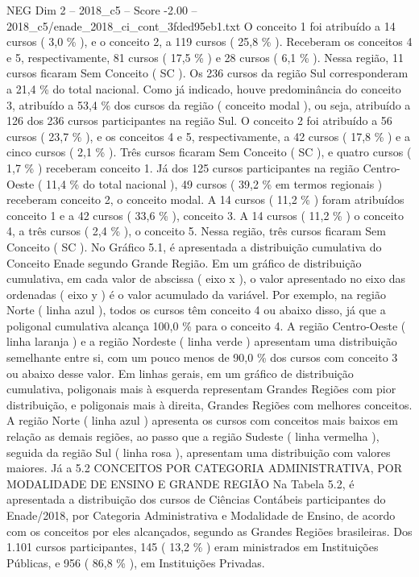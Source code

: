 \begin{textsample}{NEG Dim 2 – 2018\_c5 – Score -2.00 – 2018\_c5/enade\_2018\_ci\_cont\_3fded95eb1.txt}
O conceito 1 foi atribuído a 14 cursos ( 3,0 \% ), e o conceito 2, a 119 cursos ( 25,8 \% ).
Receberam os conceitos 4 e 5, respectivamente, 81 cursos ( 17,5 \% ) e 28 cursos ( 6,1 \% ).
Nessa região, 11 cursos ficaram Sem Conceito ( SC ).
Os 236 cursos da região Sul corresponderam a 21,4 \% do total nacional.
Como já indicado, houve predominância do conceito 3, atribuído a 53,4 \% dos cursos da região ( conceito modal ), ou seja, atribuído a 126 dos 236 cursos participantes na região Sul.
O conceito 2 foi atribuído a 56 cursos ( 23,7 \% ), e os conceitos 4 e 5, respectivamente, a 42 cursos ( 17,8 \% ) e a cinco cursos ( 2,1 \% ).
Três cursos ficaram Sem Conceito ( SC ), e quatro cursos ( 1,7 \% ) receberam conceito 1.
Já dos 125 cursos participantes na região Centro-Oeste ( 11,4 \% do total nacional ), 49 cursos ( 39,2 \% em termos regionais ) receberam conceito 2, o conceito modal.
A 14 cursos ( 11,2 \% ) foram atribuídos conceito 1 e a 42 cursos ( 33,6 \% ), conceito 3.
A 14 cursos ( 11,2 \% ) o conceito 4, a três cursos ( 2,4 \% ), o conceito 5.
Nessa região, três cursos ficaram Sem Conceito ( SC ).
No Gráfico 5.1, é apresentada a distribuição cumulativa do Conceito Enade segundo Grande Região.
Em um gráfico de distribuição cumulativa, em cada valor de abscissa ( eixo x ), o valor apresentado no eixo das ordenadas ( eixo y ) é o valor acumulado da variável.
Por exemplo, na região Norte ( linha azul ), todos os cursos têm conceito 4 ou abaixo disso, já que a poligonal cumulativa alcança 100,0 \% para o conceito 4.
A região Centro-Oeste ( linha laranja ) e a região Nordeste ( linha verde ) apresentam uma distribuição semelhante entre si, com um pouco menos de 90,0 \% dos cursos com conceito 3 ou abaixo desse valor.
Em linhas gerais, em um gráfico de distribuição cumulativa, poligonais mais à esquerda representam Grandes Regiões com pior distribuição, e poligonais mais à direita, Grandes Regiões com melhores conceitos.
A região Norte ( linha azul ) apresenta os cursos com conceitos mais baixos em relação as demais regiões, ao passo que a região Sudeste ( linha vermelha ), seguida da região Sul ( linha rosa ), apresentam uma distribuição com valores maiores.
Já a 5.2 CONCEITOS POR CATEGORIA ADMINISTRATIVA, POR MODALIDADE DE ENSINO E GRANDE REGIÃO Na Tabela 5.2, é apresentada a distribuição dos cursos de Ciências Contábeis participantes do Enade/2018, por Categoria Administrativa e Modalidade de Ensino, de acordo com os conceitos por eles alcançados, segundo as Grandes Regiões brasileiras.
Dos 1.101 cursos participantes, 145 ( 13,2 \% ) eram ministrados em Instituições Públicas, e 956 ( 86,8 \% ), em Instituições Privadas.

\end{textsample}
